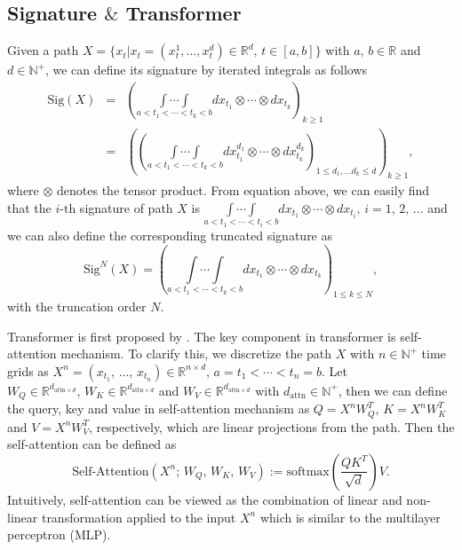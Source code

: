 \documentclass[]{article}
\renewcommand{\(}{\left(}
\renewcommand{\)}{\right)}
\begin{document}
	\subsection{Signature $\&$ Transformer}
	Given a path $X=\{x_t | x_t=(x_t^1,\ldots,x_t^d)\in\mathbb{R}^d,\,t\in[a,b]\}$ with $a,\,b\in\mathbb{R}$ and $d\in\mathbb{N}^+$, we can define its signature by iterated integrals as follows
	\begin{eqnarray}\label{eq-signature}
		\text{Sig}(X)
		&=&\left(\underset{a<t_1<\cdots<t_k<b}{\int\cdots\int}dx_{t_1}\otimes\cdots\otimes dx_{t_k}\right)_{k\geq1}\nonumber\\
		&=&\left(\left(\underset{a<t_1<\cdots<t_k<b}{\int\cdots\int}dx_{t_1}^{d_1}\otimes\cdots\otimes dx_{t_k}^{d_k}\right)_{1\leq d_1,\ldots d_k\leq d}\right)_{k\geq1},
	\end{eqnarray}
	where $\otimes$ denotes the tensor product. From equation above, we can easily find that the $i\text{-th}$ signature of path $X$ is $\underset{a<t_1<\cdots<t_i<b}{\int\cdots\int}dx_{t_1}\otimes\cdots\otimes dx_{t_i},\,i=1,\,2,\,\ldots$ and we can also define the corresponding truncated signature as
	\begin{equation}
		\text{Sig}^N(X)=\left(\underset{a<t_1<\cdots<t_k<b}{\int\cdots\int}dx_{t_1}\otimes\cdots\otimes dx_{t_k}\right)_{1\leq k\leq N},
	\end{equation}
	with the truncation order $N$.
	
	Transformer is first proposed by \cite{vaswani_2017}. The key component in transformer is self-attention mechanism. To clarify this, we discretize the path $X$ with $n\in\mathbb{N}^+$ time grids as $X^n=(x_{t_1},\,\ldots,\,x_{t_n})\in\mathbb{R}^{n\times d},\,a=t_1<\cdots<t_n=b$. Let $W_Q\in\mathbb{R}^{d_{\text{attn}\times d}},\,W_K\in\mathbb{R}^{d_{\text{attn}\times d}}$ and $W_V\in\mathbb{R}^{d_{\text{attn}\times d}}$ with $d_{\text{attn}}\in\mathbb{N}^+$, then we can define the query, key and value in self-attention mechanism as $Q=X^nW_Q^T,\, K=X^nW_K^T$ and $V=X^nW_V^T$, respectively, which are linear projections from the path. Then the self-attention can be defined as
	\begin{equation}
		\label{eq-self-attention}
		\text{Self-Attention}(X^n;\,W_Q,\,W_K,\,W_V):=\text{softmax}\left(\frac{QK^T}{\sqrt{d}}\right)V.
	\end{equation}
	Intuitively, self-attention can be viewed as the combination of linear and non-linear transformation applied to the input $X^n$ which is similar to the multilayer perceptron (MLP).
	
\end{document}

